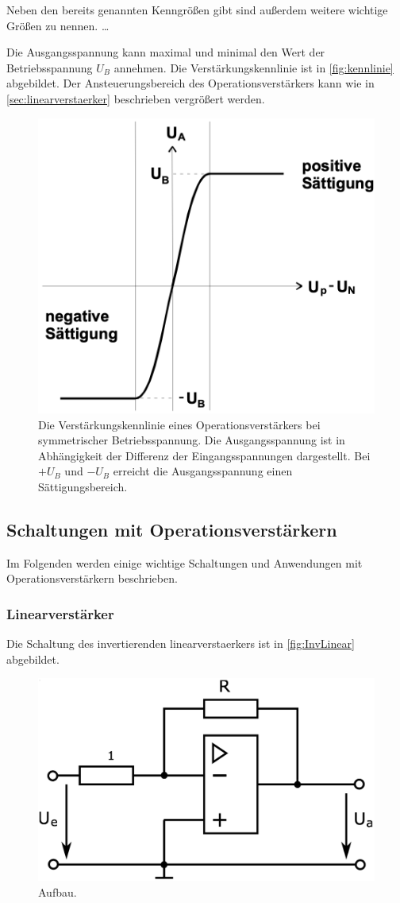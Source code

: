Neben den bereits genannten Kenngrößen gibt sind außerdem weitere wichtige Größen zu nennen. \dots

Die Ausgangsspannung kann maximal und minimal den Wert der Betriebsspannung $U_B$ annehmen. Die Verstärkungskennlinie ist in \autoref{fig:kennlinie} abgebildet. Der Ansteuerungsbereich des Operationsverstärkers kann wie in \autoref{sec:linearverstaerker} beschrieben vergrößert werden.

\begin{figure}
    \centering
    \includegraphics[width=0.5\linewidth]{./figures/Kennlinie.png}
    \caption{Die Verstärkungskennlinie eines Operationsverstärkers bei symmetrischer Betriebsspannung. Die Ausgangsspannung ist in Abhängigkeit der Differenz der Eingangsspannungen dargestellt. Bei $+U_B$ und $-U_B$ erreicht die Ausgangsspannung einen Sättigungsbereich.} %
    \label{fig:kennlinie}
\end{figure}




\subsection{Schaltungen mit Operationsverstärkern}
\label{sec:Schaltungen}

Im Folgenden werden einige wichtige Schaltungen und Anwendungen mit Operationsverstärkern beschrieben.

\subsubsection{Linearverstärker}
\label{sec:linearverstaerker}
Die Schaltung des invertierenden linearverstaerkers ist in \autoref{fig:InvLinear} abgebildet.

\begin{figure}
    \centering
    \includegraphics[width=0.7\linewidth]{./figures/1_InvLinear.png}
    \caption{Aufbau. \cite{Anleitung}} %
    \label{fig:InvLinear}
\end{figure}

